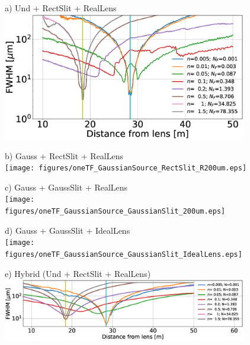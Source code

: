 \documentclass{iucr}              %
\begin{document}

    


\begin{figure}
    \centering
    
    a) Und + RectSlit + RealLens \\
    \includegraphics[width=0.95\textwidth]{figures/oneTF_UndSource_RectSlit_R200um.eps}
    
    b) Gauss + RectSlit + RealLens \\
    \texttt{[image: figures/oneTF\_GaussianSource\_RectSlit\_R200um.eps]}
    
    c) Gauss + GaussSlit + RealLens \\
    \texttt{[image: figures/oneTF\_GaussianSource\_GaussianSlit\_200um.eps]}

    d) Gauss + GaussSlit + IdealLens \\
    \texttt{[image: figures/oneTF\_GaussianSource\_GaussianSlit\_IdealLens.eps]}
    
    e) Hybrid (Und + RectSlit + RealLens) \\
    \includegraphics[width=0.95\textwidth]{figures/oneTF_ShadowHybrid_R200um.eps}
    

\end{figure}
\end{document}
